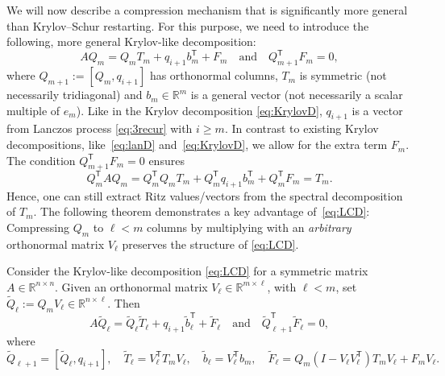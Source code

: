 \documentclass{siamart190516}
\newcommand{\Ttran}{\mathsf{T}}
\newcommand{\defi}{:=}
\newcommand{\R}{\mathbb{R}}
\begin{document}
We will now describe a compression mechanism that is significantly more general than Krylov--Schur restarting. For this purpose,
we need to introduce the following, more general Krylov-like decomposition:
\begin{equation}
    \label{eq:LCD}
    AQ_{m}=Q_{m}T_{m}+q_{i+1}b_{m}^{\Ttran}+F_{m}
    \quad\text{and}\quad 
    Q_{m+1}^{\Ttran}F_{m}=0,
\end{equation}
where $Q_{m+1}\defi [Q_{m},q_{i+1}]$ has orthonormal columns, $T_{m}$ is symmetric (not necessarily tridiagonal) and $b_{m} \in \R^m$ is a general vector (not necessarily a scalar multiple of $e_m$).
Like in the Krylov decomposition \cref{eq:KrylovD}, $q_{i+1}$ is a vector from Lanczos process \cref{eq:3recur} with $i\geq m$. 
In contrast to existing Krylov decompositions, like~\eqref{eq:lanD} and~\eqref{eq:KrylovD}, we allow for the extra term $F_{m}$.
The condition $Q_{m+1}^{\Ttran}F_{m}=0$ ensures
\begin{equation*}
    Q_{m}^{\Ttran}AQ_{m} = Q_{m}^{\Ttran} Q_{m} T_{m} +Q_{m}^{\Ttran}q_{i+1}b_{m}^{\Ttran}+Q_{m}^{\Ttran}F_{m} = T_m.
\end{equation*} 
Hence, one can still extract Ritz values/vectors from the spectral decomposition of $T_m$.
The following theorem demonstrates a key advantage of~\eqref{eq:LCD}: Compressing $Q_{m}$ to $\ell < m$ columns by multiplying with an \emph{arbitrary} orthonormal matrix $V_{\ell}$ preserves the structure of \cref{eq:LCD}. 
\begin{theorem}
    \label{thmLan}
    Consider the Krylov-like decomposition \cref{eq:LCD} for a symmetric matrix $A\in\R^{n\times n}$.
    Given an orthonormal matrix $V_{\ell} \in \R^{m \times \ell}$, with $\ell< m$,
    set $\widetilde{Q}_{\ell} := Q_{m}V_{\ell} \in \R^{n\times \ell}$. Then
    \begin{equation*}
        A\widetilde{Q}_{\ell}=\widetilde{Q}_{\ell}
        \widetilde{T}_{\ell}
        +q_{i+1}\widetilde{b}_{\ell}^{\Ttran}
        +\widetilde{F}_{\ell} \quad \text{and}\quad 
        \widetilde{Q}_{\ell+1}^{\Ttran}\widetilde{F}_{\ell}=0,
    \end{equation*}
    where
    \begin{equation*}
        \widetilde{Q}_{\ell+1}=[\widetilde{Q}_{\ell},q_{i+1}], \quad \widetilde{T}_{\ell} = V_{\ell}^{\Ttran}T_{m}V_{\ell},\quad
        \widetilde{b}_{\ell}=V_{\ell}^{\Ttran}b_{m}, \quad \widetilde{F}_{\ell} = Q_{m}(I-V_{\ell}V_{\ell}^{\Ttran})T_{m}V_{\ell}+F_{m}V_{\ell}.
    \end{equation*} 
\end{theorem}
\end{document}
